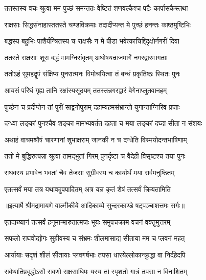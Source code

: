 \twolineshloka
{ततस्तस्य वचः श्रुत्वा मम पुच्छं समन्ततः}
{वेष्टितं शणवल्कैश्च पटैः कार्पासकैस्तथा} %

\twolineshloka
{राक्षसाः सिद्धसंनाहास्ततस्ते चण्डविक्रमाः}
{तदादीप्यन्त मे पुच्छं हनन्तः काष्ठमुष्टिभिः} %

\twolineshloka
{बद्धस्य बहुभिः पाशैर्यन्त्रितस्य च राक्षसैः}
{न मे पीडा भवेत्काचिद्दिदृक्षोर्नगरीं दिवा} %

\twolineshloka
{ततस्ते राक्षसाः शूरा बद्धं मामग्निसंवृतम्}
{अघोषयन्राजमार्गे नगरद्वारमागताः} %

\twolineshloka
{ततोऽहं सुमहद्रूपं संक्षिप्य पुनरात्मनः}
{विमोचयित्वा तं बन्धं प्रकृतिष्ठः स्थितः पुनः} %

\twolineshloka
{आयसं परिघं गृह्य तानि रक्षांस्यसूदयम्}
{ततस्तन्नगरद्वारं वेगेनाप्लुतवानहम्} %

\twolineshloka
{पुच्छेन च प्रदीप्तेन तां पुरीं साट्टगोपुराम्}
{दहाम्यहमसंभ्रान्तो युगान्ताग्निरिव प्रजाः} %

\twolineshloka
{दग्ध्वा लङ्कां पुनश्चैव शङ्का मामभ्यवर्तत}
{दहता च मया लङ्कां दघ्दा सीता न संशयः} %

\twolineshloka
{अथाहं वाचमश्रौषं चारणानां शुभाक्षराम्}
{जानकी न च दग्धेति विस्मयोदन्तभाषिणाम्} %

\twolineshloka
{ततो मे बुद्धिरुत्पन्ना श्रुत्वा तामद्भुतां गिरम्}
{पुनर्दृष्टा च वैदेही विसृष्टश्च तया पुनः} %

\twolineshloka
{राघवस्य प्रभावेन भवतां चैव तेजसा}
{सुग्रीवस्य च कार्यार्थं मया सर्वमनुष्ठितम्} %

\twolineshloka
{एतत्सर्वं मया तत्र यथावदुपपादितम्}
{अत्र यन्न कृतं शेषं तत्सर्वं क्रियतामिति} %


{॥इत्यार्षे श्रीमद्रामायणे वाल्मीकीये आदिकाव्ये सुन्दरकाण्डे षट्पञ्चाशत्तमः सर्गः॥}


\twolineshloka
{एतदाख्यानं तत्सर्वं हनूमान्मारुतात्मजः}
{भूयः समुपचक्राम वचनं वक्तुमुत्तरम्} %

\twolineshloka
{सफलो राघवोद्योगः सुग्रीवस्य च संभ्रमः}
{शीलमासाद्य सीताया मम च प्लवनं महत्} %

\twolineshloka
{आर्यायाः सदृशं शीलं सीतायाः प्लवगर्षभाः}
{तपसा धारयेल्लोकान्क्रुद्धा वा निर्दहेदपि} %

\twolineshloka
{सर्वथातिप्रवृद्धोऽसौ रावणो राक्षसाधिपः}
{यस्य तां स्पृशतो गात्रं तपसा न विनाशितम्} %

